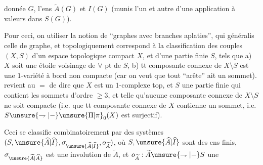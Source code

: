 donnée $G$, l'ens $\widetilde A(G)$ et $I(G)$ (munis l'un et autre d'une application  à valeurs dans $S(G)$).

Pour ceci, on  utiliser la notion de ``graphes avec branches aplaties'', qui généralis celle de graphe, et topologiquement correspond à la classification des  couples $(X,S)$ d'un espace topologique compact $X$, et d'une partie finie $S$, tels que a) $X$ soit une étoile  voisinage de $\forall$ pt de $S$,  b)  tt composante connexe de $X\setminus S$ est une $1$-variété à bord non compacte (car on veut que tout  ``arête'' ait un sommet).  revient au $=$ de dire que $X$ est un $1$-complexe top, et $S$ une partie finie qui contient les sommets d'ordre $\geq3$, et telle qu'aucune composante connexe de $X\setminus S$ ne soit compacte (i.e. que tt composante connexe de $X$ contienne un sommet, i.e. $S\unsure{\rightharpoondown|{-}}\unsure{\Pi|\pi}_0(X)$ est surjectif).

Ceci se classifie combinatoirement par des systèmes $(S,\unsure{\widehat A|\widehat I},\sigma_{\unsure{\widehat A|\widehat I}},o_{\widetilde A})$, où  $S,\unsure{\widehat A|\widehat I}$ sont des ens finis, $\sigma_{\unsure{\widetilde A|\widehat A}}$ est une involution de $\widetilde A$, et $o_{\widetilde A}:\widetilde A\unsure{\rightharpoondown|{-}}S$ une
